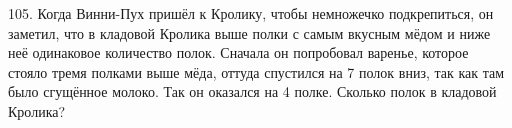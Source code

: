 105. Когда Винни-Пух пришёл к Кролику, чтобы немножечко подкрепиться, он заметил, что в кладовой Кролика выше полки с самым вкусным мёдом и ниже неё одинаковое количество полок. Сначала он попробовал варенье, которое стояло тремя полками выше мёда, оттуда спустился на 7 полок вниз, так как там было сгущённое молоко. Так он оказался на 4 полке. Сколько полок в кладовой Кролика?\\
